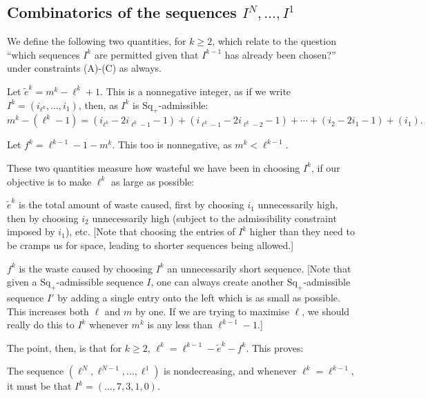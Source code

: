 \documentclass[11pt]{article}
\newcommand{\SqShift}{\Sq_{+}}
\newcommand{\Sq}{\mathrm{Sq}}
\newcommand{\minDim}{m}
\begin{document}
\begin{CalculatingRepeatedKoszul}
\begin{KoszulSequenceCombinatorics}
\subsection{Combinatorics of  the sequences $I^N,\ldots,I^1$}
We define the following two quantities, for $k\geq2$, which relate to the question ``which sequences $I^k$ are permitted given that $I^{k-1}$ has already been chosen?'' under constraints (A)-(C) as always.
\begin{itemise}
\setlength{\parindent}{.25in}
\item Let $\widetilde{e}^k=\minDim^k-\ell^{k}+1$. This is a nonnegative integer, as if we write $I^k=(i_{\ell^k},\ldots,i_1)$, then, as $I^k$ is $\SqShift$-admissible:
\[\minDim^k-(\ell^k-1)=(i_{\ell^k}-2i_{\ell^k-1}-1)+ (i_{\ell^k-1}-2i_{\ell^k-2}-1)+\cdots + (i_{2}-2i_{1}-1)+(i_1).\]
\item Let $f^k=\ell^{k-1}-1-\minDim^k$. This too is nonnegative, as $\minDim^k<\ell^{k-1}$.
\end{itemise}
These two quantities measure how wasteful we have been in choosing $I^k$, if our objective is to make $\ell^k$ as large as possible:
\begin{itemise}
\setlength{\parindent}{.25in}
\item $\widetilde{e}^k$ is the total amount of waste caused, first by choosing $i_1$ unnecessarily high, then by choosing $i_2$ unnecessarily high (subject to the admissibility constraint imposed by $i_1$), etc. [Note that choosing the entries of $I^k$ higher than they need to be cramps us for space, leading to shorter sequences being allowed.]
\item $f^k$ is the waste caused by choosing $I^k$ an unnecessarily short sequence. [Note that given a $\SqShift$-admissible sequence $I$, one can always create another $\SqShift$-admissible sequence $I'$ by adding a single entry onto the left which is as small as possible. This increases both $\ell$ and $\minDim$ by one. If we are trying to maximise $\ell$, we should really do this to $I^k$ whenever $\minDim^k$ is any less than $\ell^{k-1}-1$.]
\end{itemise}
The point, then, is that for $k\geq2$, $\ell^k=\ell^{k-1}-\widetilde{e}^k-f^k$. This proves:
\begin{lem*}
The sequence $(\ell^N,\ell^{N-1},\ldots,\ell^1)$ is nondecreasing, and whenever $\ell^k=\ell^{k-1}$, it must be that $I^k=(\ldots,7,3,1,0)$.
\end{lem*}

\end{KoszulSequenceCombinatorics}
\end{CalculatingRepeatedKoszul}
\end{document}
